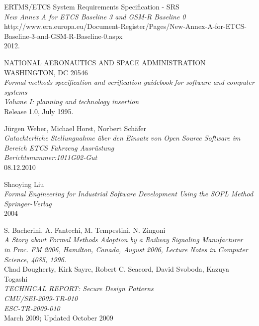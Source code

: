 \documentclass{template/openetcs_report}
\begin{document}
\begin{thebibliography}{99}
  ERTMS/ETCS System Requirements Specification  - SRS\\
  \emph{ New Annex A for ETCS Baseline 3 and GSM-R Baseline 0}\\
  http://www.era.europa.eu/Document-Register/Pages/New-Annex-A-for-ETCS-Baseline-3-and-GSM-R-Baseline-0.aspx\\
  2012.  
  
  
  NATIONAL AERONAUTICS AND SPACE ADMINISTRATION WASHINGTON, DC 20546\\
  \emph{Formal methods specification and verification guidebook for software and computer systems\\
  Volume I: planning and technology insertion}\\
  Release 1.0,
  July 1995.
  
  
  J\"urgen Weber, Michael Horst, Norbert Sch\"afer\\
  \emph{Gutachterliche Stellungnahme über den Einsatz von Open Source Software im Bereich ETCS Fahrzeug Ausrüstung\\
  Berichtsnummer:1011G02-Gut}\\
  08.12.2010
  
  Shaoying Liu\\
  \emph{Formal Engineering for Industrial Software Development Using the  SOFL Method\\
  Springer-Verlag}\\
  2004 
     
  S. Bacherini, A. Fantechi, M. Tempestini, N. Zingoni\\
  \emph{A Story about Formal Methods Adoption by a Railway Signaling Manufacturer\\
  in Proc. FM 2006, Hamilton, Canada, August 2006, Lecture Notes in Computer Science, 4085, 1996.}\\
  
  Chad Dougherty, Kirk Sayre, Robert C. Seacord, David Svoboda, Kazuya Togashi\\
  \emph{TECHNICAL REPORT: Secure Design Patterns\\
  CMU/SEI-2009-TR-010\\ 
  ESC-TR-2009-010}\\
  March 2009; Updated October 2009   
  
  
\end{thebibliography}

\end{document}

